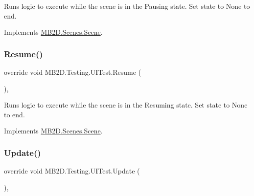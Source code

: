 Runs logic to execute while the scene is in the Pausing state. Set state to None to end. 



Implements \hyperlink{class_m_b2_d_1_1_scenes_1_1_scene_a0661eff0223150fa8e9ea88145409e5d}{M\+B2\+D.\+Scenes.\+Scene}.

\hypertarget{class_m_b2_d_1_1_testing_1_1_u_i_test_a933c2bf347db47bf2921709c10d78acc}{}\label{class_m_b2_d_1_1_testing_1_1_u_i_test_a933c2bf347db47bf2921709c10d78acc} 
\subsubsection{\texorpdfstring{Resume()}{Resume()}}
{\footnotesize\ttfamily override void M\+B2\+D.\+Testing.\+U\+I\+Test.\+Resume (\begin{DoxyParamCaption}{ }\end{DoxyParamCaption})\hspace{0.3cm}{\ttfamily [inline]}, {\ttfamily [virtual]}}



Runs logic to execute while the scene is in the Resuming state. Set state to None to end. 



Implements \hyperlink{class_m_b2_d_1_1_scenes_1_1_scene_ad13639db22b059a1b714eefd9d927735}{M\+B2\+D.\+Scenes.\+Scene}.

\hypertarget{class_m_b2_d_1_1_testing_1_1_u_i_test_a547d5592fee47d4c9354ee8f307c8813}{}\label{class_m_b2_d_1_1_testing_1_1_u_i_test_a547d5592fee47d4c9354ee8f307c8813} 
\subsubsection{\texorpdfstring{Update()}{Update()}}
{\footnotesize\ttfamily override void M\+B2\+D.\+Testing.\+U\+I\+Test.\+Update (\begin{DoxyParamCaption}{ }\end{DoxyParamCaption})\hspace{0.3cm}{\ttfamily [inline]}, {\ttfamily [virtual]}}



